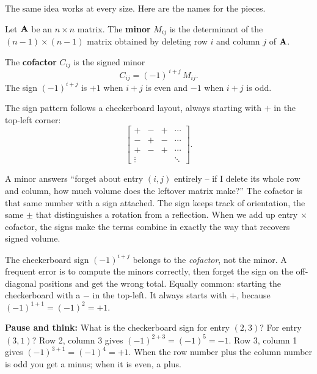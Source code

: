 The same idea works at every size. Here are the names for the pieces.

\begin{definition}[Minor]\label{ch22:def-minor}
Let $\mathbf{A}$ be an $n\times n$ matrix. The \textbf{minor} $M_{ij}$ is the determinant of the
$(n-1)\times(n-1)$ matrix obtained by deleting row $i$ and column $j$ of $\mathbf{A}$.
\end{definition}

\begin{definition}[Cofactor]\label{ch22:def-cofactor}
The \textbf{cofactor} $C_{ij}$ is the signed minor
\[
C_{ij} = (-1)^{\,i+j}\,M_{ij}.
\]
The sign $(-1)^{i+j}$ is $+1$ when $i+j$ is even and $-1$ when $i+j$ is odd.
\end{definition}

The sign pattern follows a checkerboard layout, always starting with $+$ in the top-left corner:
\[
\begin{bmatrix}
+ & - & + & \cdots \\
- & + & - & \cdots \\
+ & - & + & \cdots \\
\vdots & & & \ddots
\end{bmatrix}.
\]

\begin{intuitionbox}
A minor answers ``forget about entry $(i,j)$ entirely -- if I delete its whole row and column, how
much volume does the leftover matrix make?'' The cofactor is that same number with a sign attached.
The sign keeps track of orientation, the same $\pm$ that distinguishes a rotation from a reflection.
When we add up entry $\times$ cofactor, the signs make the terms combine in exactly the way that
recovers signed volume.
\end{intuitionbox}

\begin{trapbox}
The checkerboard sign $(-1)^{i+j}$ belongs to the \emph{cofactor}, not the minor. A frequent error is
to compute the minors correctly, then forget the sign on the off-diagonal positions and get the wrong
total. Equally common: starting the checkerboard with a $-$ in the top-left. It always starts with
$+$, because $(-1)^{1+1}=(-1)^2=+1$.
\end{trapbox}

\begin{labbox}
\textbf{Pause and think:} What is the checkerboard sign for entry $(2,3)$? For entry $(3,1)$?
Row 2, column 3 gives $(-1)^{2+3} = (-1)^5 = -1$. Row 3, column 1 gives
$(-1)^{3+1} = (-1)^4 = +1$. When the row number plus the column number is odd you get a minus; when
it is even, a plus.
\end{labbox}

